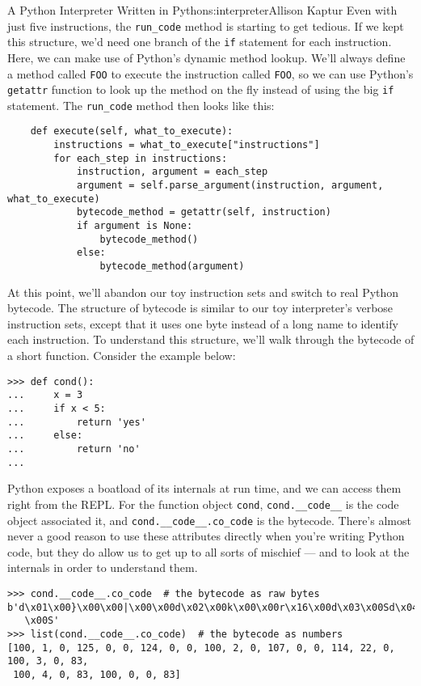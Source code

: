 \begin{aosachapter}{A Python Interpreter Written in Python}{s:interpreter}{Allison Kaptur}
Even with just five instructions, the \texttt{run\_code} method is
starting to get tedious. If we kept this structure, we'd need one branch
of the \texttt{if} statement for each instruction. Here, we can make use
of Python's dynamic method lookup. We'll always define a method called
\texttt{FOO} to execute the instruction called \texttt{FOO}, so we can
use Python's \texttt{getattr} function to look up the method on the fly
instead of using the big \texttt{if} statement. The \texttt{run\_code}
method then looks like this:

\begin{verbatim}
    def execute(self, what_to_execute):
        instructions = what_to_execute["instructions"]
        for each_step in instructions:
            instruction, argument = each_step
            argument = self.parse_argument(instruction, argument, what_to_execute)
            bytecode_method = getattr(self, instruction)
            if argument is None:
                bytecode_method()
            else:
                bytecode_method(argument)
\end{verbatim}

\label{real-python-bytecode}

At this point, we'll abandon our toy instruction sets and switch to real
Python bytecode. The structure of bytecode is similar to our toy
interpreter's verbose instruction sets, except that it uses one byte
instead of a long name to identify each instruction. To understand this
structure, we'll walk through the bytecode of a short function. Consider
the example below:

\begin{verbatim}
>>> def cond():
...     x = 3
...     if x < 5:
...         return 'yes'
...     else:
...         return 'no'
...
\end{verbatim}

Python exposes a boatload of its internals at run time, and we can
access them right from the REPL. For the function object \texttt{cond},
\texttt{cond.\_\_code\_\_} is the code object associated it, and
\texttt{cond.\_\_code\_\_.co\_code} is the bytecode. There's almost
never a good reason to use these attributes directly when you're writing
Python code, but they do allow us to get up to all sorts of mischief ---
and to look at the internals in order to understand them.

\begin{verbatim}
>>> cond.__code__.co_code  # the bytecode as raw bytes
b'd\x01\x00}\x00\x00|\x00\x00d\x02\x00k\x00\x00r\x16\x00d\x03\x00Sd\x04\x00Sd\x00
   \x00S'
>>> list(cond.__code__.co_code)  # the bytecode as numbers
[100, 1, 0, 125, 0, 0, 124, 0, 0, 100, 2, 0, 107, 0, 0, 114, 22, 0, 100, 3, 0, 83, 
 100, 4, 0, 83, 100, 0, 0, 83]
\end{verbatim}


\end{aosachapter}

